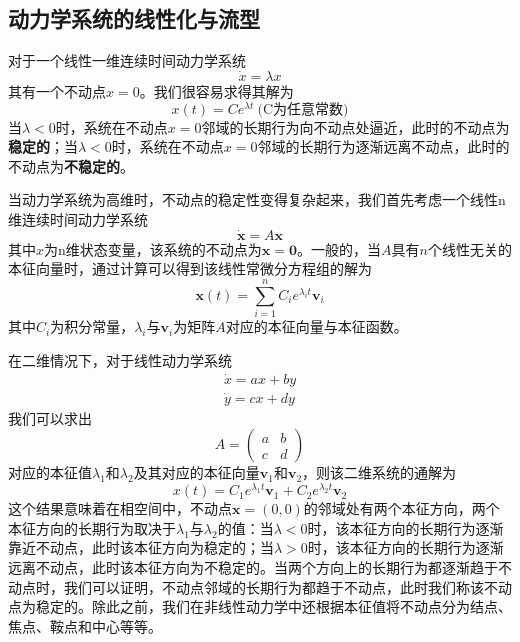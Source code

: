 \subsection{动力学系统的线性化与流型}

对于一个线性一维连续时间动力学系统
\begin{equation}
    \dot{x}=\lambda x
\end{equation}
其有一个不动点$x=0$。我们很容易求得其解为
\begin{equation}
    x(t)=Ce^{\lambda t}\   \text{(C为任意常数)}
\end{equation}
当$\lambda<0$时，系统在不动点$x=0$邻域的长期行为向不动点处逼近，此时的不动点为\textbf{稳定的}；当$\lambda<0$时，系统在不动点$x=0$邻域的长期行为逐渐远离不动点，此时的不动点为\textbf{不稳定的}。

当动力学系统为高维时，不动点的稳定性变得复杂起来，我们首先考虑一个线性n维连续时间动力学系统
\begin{equation}
    \dot{\mathbf{x}}=A\mathbf{x}
\end{equation}
其中$x$为n维状态变量，该系统的不动点为$\mathbf{x}=\mathbf{0}$。一般的，当$A$具有$n$个线性无关的本征向量时，通过计算可以得到该线性常微分方程组的解为
\begin{equation}
    \mathbf{x}(t)=\sum_{i=1}^n C_ie^{\lambda_it}\mathbf{v}_i
\end{equation}
其中$C_i$为积分常量，$\lambda_i$与$\mathbf{v}_i$为矩阵$A$对应的本征向量与本征函数。

在二维情况下，对于线性动力学系统
\begin{equation}
    \begin{aligned}
        \dot{x}=ax+by\\
        \dot{y}=cx+dy
    \end{aligned}
\end{equation}
我们可以求出
\begin{equation}
    A=\begin{pmatrix}
        a & b \\
        c & d
    \end{pmatrix}
\end{equation}
对应的本征值$\lambda_1$和$\lambda_2$及其对应的本征向量$\mathbf{v}_1$和$\mathbf{v}_2$，则该二维系统的通解为
\begin{equation}
    x(t)=C_1e^{\lambda_1t}\mathbf{v}_1+C_2e^{\lambda_2t}\mathbf{v}_2
\end{equation}
这个结果意味着在相空间中，不动点$\mathbf{x}=(0,0)$的邻域处有两个本征方向，两个本征方向的长期行为取决于$\lambda_1$与$\lambda_2$的值：当$\lambda<0$时，该本征方向的长期行为逐渐靠近不动点，此时该本征方向为稳定的；当$\lambda>0$时，该本征方向的长期行为逐渐远离不动点，此时该本征方向为不稳定的。当两个方向上的长期行为都逐渐趋于不动点时，我们可以证明，不动点邻域的长期行为都趋于不动点，此时我们称该不动点为稳定的。除此之前，我们在非线性动力学中还根据本征值将不动点分为结点、焦点、鞍点和中心等等。

